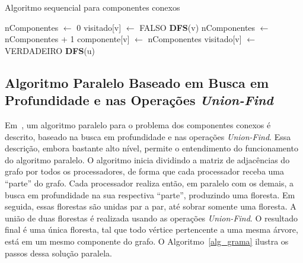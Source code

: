 \documentclass[12pt]{article}
\begin{document}
\begin{algorithm}[!htb]
    \DontPrintSemicolon
    \caption{Algoritmo sequencial para componentes conexos}
    \label{alg_seq}
	{
        nComponentes $\gets$ 0\;
        {
            visitado[v] $\gets$ FALSO\;
        }
        {
            {
                \textbf{DFS}(v)\;
                nComponentes $\gets$ nComponentes + 1\;
            }
        }
    }
    {
        componente[v] $\gets$ nComponentes\; 
        visitado[v] $\gets$ VERDADEIRO\;
        {
            {
                \textbf{DFS}(u)\;
            }
        }
    }
\end{algorithm}

\subsection{Algoritmo Paralelo Baseado em Busca em Profundidade e nas Operações \emph{Union-Find}}

Em~\cite{Grama:2003}, um algoritmo paralelo para o problema dos componentes conexos é descrito, baseado na busca em profundidade e nas operações \emph{Union-Find}. Essa descrição, embora bastante alto nível, permite o entendimento do funcionamento do algoritmo paralelo. O algoritmo inicia dividindo a matriz de adjacências do grafo por todos os processadores, de forma que cada processador receba uma ``parte'' do grafo. Cada processador realiza então, em paralelo com os demais, a busca em profundidade na sua respectiva ``parte'', produzindo uma floresta. Em seguida, essas florestas são unidas par a par, até sobrar somente uma floresta. A união de duas florestas é realizada usando as operações \emph{Union-Find}. O resultado final é uma única floresta, tal que todo vértice pertencente a uma mesma árvore, está em um mesmo componente do grafo. O Algoritmo~\ref{alg_grama} ilustra os passos dessa solução paralela.
\end{document}
